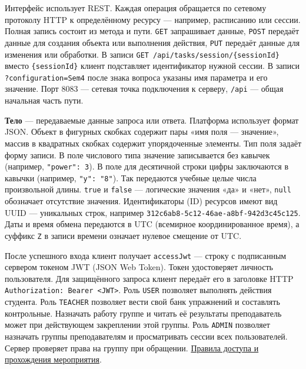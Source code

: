 \documentclass[12pt,a4paper]{article}
\begin{document}
\hypertarget{как-читать-запись-операции}{}

Интерфейс использует REST. Каждая операция обращается по сетевому протоколу HTTP к определённому ресурсу --- например, расписанию или сессии. Полная запись состоит из метода и пути. \texttt{GET} запрашивает данные, \texttt{POST} передаёт данные для создания объекта или выполнения действия, \texttt{PUT} передаёт данные для изменения или обработки. В записи \texttt{GET /\allowbreak{}api/\allowbreak{}tasks/\allowbreak{}session/\allowbreak{}\{session\allowbreak{}Id\}} вместо \texttt{\{session\allowbreak{}Id\}} клиент подставляет идентификатор нужной сессии. В записи \texttt{?configuration=Sem4} после знака вопроса указаны имя параметра и его значение. Порт 8083 --- сетевая точка подключения к серверу, \texttt{/api} --- общая начальная часть пути.

\textbf{Тело} --- передаваемые данные запроса или ответа. Платформа использует формат JSON. Объект в фигурных скобках содержит пары «имя поля --- значение», массив в квадратных скобках содержит упорядоченные элементы. Тип поля задаёт форму записи. В поле числового типа значение записывается без кавычек (например, \texttt{"power":\ 3}). В поле для десятичной строки цифры заключаются в кавычки (например, \texttt{"y":\ "8"}). Так передаются учебные целые числа произвольной длины. \texttt{true} и \texttt{false} --- логические значения «да» и «нет», \texttt{null} обозначает отсутствие значения. Идентификаторы (ID) ресурсов имеют вид UUID --- уникальных строк, например \texttt{312c6ab8-\allowbreak{}5c12-\allowbreak{}46ae-\allowbreak{}a8bf-\allowbreak{}942d3c45c125}. Даты и время обмена передаются в UTC (всемирное координированное время), а суффикс \texttt{Z} в записи времени означает нулевое смещение от UTC.

После успешного входа клиент получает \texttt{accessJwt} --- строку с подписанным сервером токеном JWT (JSON Web Token). Токен удостоверяет личность пользователя. Для защищённого запроса клиент передаёт его в заголовке HTTP \texttt{Authorization:\ Bearer\ \textless{}JWT\textgreater{}}. Роль \texttt{USER} позволяет выполнять действия студента. Роль \texttt{TEACHER} позволяет вести свой банк упражнений и составлять контрольные. Назначать работу группе и читать её результаты преподаватель может при действующем закреплении этой группы. Роль \texttt{ADMIN} позволяет назначать группы преподавателям и просматривать сессии всех пользователей. Сервер проверяет права на группу при обращении. {\href{../02\_Техническое\_задание/Техническое\_задание.pdf\#правила-доступа-и-прохождения-контрольного-мероприятия}{Правила доступа и прохождения мероприятия}}.
\end{document}
